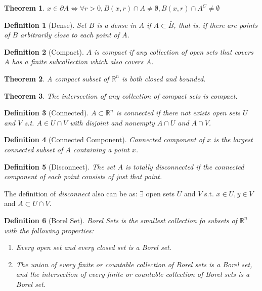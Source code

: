 \documentclass[12pt, a4paper]{article}
\newtheorem{definition}{Definition}[subsection]
\newtheorem{theorem}{Theorem}[subsection]
\begin{document}
\begin{theorem}
    $x\in\partial A \Leftrightarrow \forall r > 0, B(x, r) \cap A \neq \emptyset, B(x, r) \cap A^C \neq \emptyset$ 
\end{theorem}

\begin{definition}[Dense]
    Set $B$ is a dense in $A$ if $A\subset \bar{B}$, that is, if there are points of $B$ arbitrarily close to each point of $A$.
\end{definition}

\begin{definition}[Compact]
    $A$ is compact if any collection of open sets that covers $A$ has a finite subcollection which also covers $A$.
\end{definition}

\begin{theorem}
    A compact subset of $\mathbb{R}^n$ is both closed and bounded.
\end{theorem}

\begin{theorem}
    The intersection of any collection of compact sets is compact.
\end{theorem}

\begin{definition}[Connected]
    $A\subset \mathbb{R}^n$ is connected if there not exists open sets $U$ and $V$ s.t. $A\in U\cap V$ with disjoint and nonempty $A\cap U$ and $A\cap V$.
\end{definition}

\begin{definition}[Connected Component]
Connected component of $x$ is the largest connected subset of $A$ containing a point $x$.
\end{definition}

\begin{definition}[Disconnect]
    The set $A$ is totally disconnected if the connected component of each point consists of just that point.
\end{definition}

The definition of \textit{disconnect} also can be as: $\exists$ open sets $U$ and $V$ s.t. $x\in U, y\in V$ and $A\subset U\cap V$.

\begin{definition}[Borel Set]
    Borel Sets is the smallest collection fo subsets of $\mathbb{R}^n$ with the following properties:
    \begin{enumerate}
        \item Every open set and every closed set is a Borel set.
        \item The union of every finite or countable collection of Borel sets is a Borel set, and the intersection of every finite or countable collection of Borel sets is a Borel set.
    \end{enumerate}
\end{definition}
\end{document}
